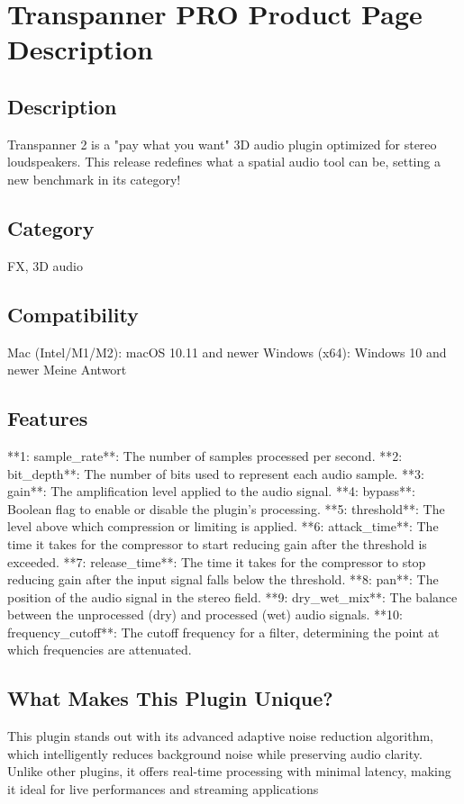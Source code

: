 \documentclass[8pt]{article}
\begin{document}
    \section*{Transpanner PRO  Product Page Description}

    \subsection*{Description}
    Transpanner 2 is a "pay what you want" 3D audio plugin optimized for stereo loudspeakers. This release redefines what a spatial audio tool can be, setting a new benchmark in its category!

    \subsection*{Category}
    FX, 3D audio

    \subsection*{Compatibility}
    Mac (Intel/M1/M2): macOS 10.11 and newer
Windows (x64): Windows 10 and newer
Meine Antwort


    \subsection*{Features}
    **1: sample_rate**: The number of samples processed per second.
**2: bit_depth**: The number of bits used to represent each audio sample.
**3: gain**: The amplification level applied to the audio signal.
**4: bypass**: Boolean flag to enable or disable the plugin’s processing.
**5: threshold**: The level above which compression or limiting is applied.
**6: attack_time**: The time it takes for the compressor to start reducing gain after the threshold is exceeded.
**7: release_time**: The time it takes for the compressor to stop reducing gain after the input signal falls below the threshold.
**8: pan**: The position of the audio signal in the stereo field.
**9: dry_wet_mix**: The balance between the unprocessed (dry) and processed (wet) audio signals.
**10: frequency_cutoff**: The cutoff frequency for a filter, determining the point at which frequencies are attenuated.

    \subsection*{What Makes This Plugin Unique?}
    This plugin stands out with its advanced adaptive noise reduction algorithm, which intelligently reduces background noise while preserving audio clarity. Unlike other plugins, it offers real-time processing with minimal latency, making it ideal for live performances and streaming applications
\end{document}
